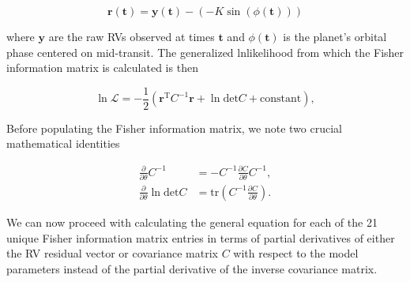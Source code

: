 \begin{equation}
  \mathbf{r}(\mathbf{t}) = \mathbf{y}(\mathbf{t}) - (-K \sin{(\phi(\mathbf{t}))})
  \label{appeq:residual}
\end{equation}

\noindent where $\mathbf{y}$ are the raw RVs observed at times $\mathbf{t}$ and $\phi(\mathbf{t})$ is
the planet's orbital phase centered on mid-transit. The generalized lnlikelihood from which the Fisher
information matrix is calculated is then

\begin{equation}
  \ln{\mathcal{L}} = -\frac{1}{2} \left(\mathbf{r}^{\text{T}} C^{-1} \mathbf{r} + \ln{\text{det}C} +
  \text{constant} \right), 
  \label{appeq:lnl}
\end{equation}

Before populating the Fisher information matrix, we note two crucial mathematical identities

\begin{align}
  \frac{\partial}{\partial \theta} C^{-1} &= -C^{-1} \frac{\partial C}{\partial \theta} C^{-1}, \\
  \frac{\partial}{\partial \theta} \ln{\text{det}C} &= \text{tr} \left(C^{-1} \frac{\partial C}{\partial \theta} \right).
\end{align}

We can now proceed with calculating the general equation for each of the 21 unique Fisher information matrix
entries in terms of partial derivatives of either the RV residual vector or covariance matrix $C$ with respect to
the model parameters instead of the partial derivative of the inverse covariance matrix. 

